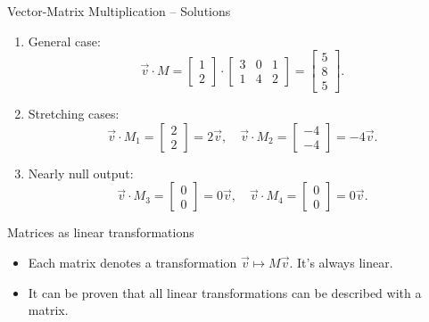 \documentclass{beamer}
\begin{document}
\begin{frame}{Vector-Matrix Multiplication – Solutions}
  \begin{enumerate}
    \item General case:
    \begin{equation}
    \vec{v} \cdot M = \begin{bmatrix} 1 \\ 2 \end{bmatrix} \cdot
    \begin{bmatrix} 3 & 0 & 1 \\ 1 & 4 & 2 \end{bmatrix}
    = \begin{bmatrix} 5 \\ 8 \\ 5 \end{bmatrix}.
    \end{equation}
    \item Stretching cases:
    \begin{equation}
    \vec{v} \cdot M_1 = \begin{bmatrix} 2 \\ 2 \end{bmatrix}=2\vec{v}, \quad
    \vec{v} \cdot M_2 = \begin{bmatrix} -4 \\ -4 \end{bmatrix} = -4\vec{v}.
    \end{equation}
    \item Nearly null output:
    \begin{equation}
    \vec{v} \cdot M_3 = \begin{bmatrix} 0 \\ 0 \end{bmatrix}=0\vec{v}, \quad
    \vec{v} \cdot M_4 = \begin{bmatrix} 0 \\ 0 \end{bmatrix}=0\vec{v}.
    \end{equation}
  \end{enumerate}
\end{frame}

\begin{frame}{Matrices as linear transformations}

\begin{itemize}
    \item Each matrix denotes a transformation $\vec{v} \mapsto M\vec{v}$. It's always linear.
    \item It can be proven that all linear transformations can be described with a matrix.
    
\end{itemize}
    
\end{frame}
\end{document}
